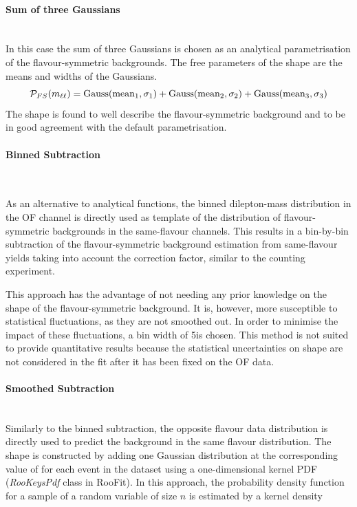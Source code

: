 \paragraph{Sum of three Gaussians}\mbox{} \\
In this case the sum of three Gaussians is chosen as an analytical parametrisation of the flavour-symmetric backgrounds. The free parameters of the shape are the means and widths of the Gaussians.
\begin{equation*}
\mathcal{P}_{FS}(m_{\ell\ell}) = \mathrm{Gauss}(\mathrm{mean}_1,\sigma_1) + \mathrm{Gauss}(\mathrm{mean}_2,\sigma_2) + \mathrm{Gauss}(\mathrm{mean}_3,\sigma_3)\\
\end{equation*}
The shape is found to well describe the flavour-symmetric background and to be in good agreement with the default parametrisation.
\paragraph{Binned Subtraction}\mbox{} \\


\label{shapesubtraction:binnedsubtraction}

As an alternative to analytical functions, the binned dilepton-mass distribution in the OF channel is directly used as  template of the distribution of flavour-symmetric backgrounds in the same-flavour channels. This results in a bin-by-bin subtraction of the flavour-symmetric background estimation from same-flavour yields taking into account the \Rsfof correction factor, similar to the counting experiment.

This approach has the advantage of not needing any prior knowledge on the shape of the flavour-symmetric background. It is, however, more susceptible to statistical fluctuations, as they are not smoothed out. In order to minimise the impact of these fluctuations, a bin width of 5\GeV is chosen. This method is not suited to provide quantitative results because the statistical uncertainties on shape are not considered in the fit after it has been fixed on the OF data.

\paragraph{Smoothed Subtraction}\mbox{} \\
Similarly to the binned subtraction, the opposite flavour data distribution is directly used to predict the background in the same flavour distribution. The shape is constructed by adding one Gaussian distribution at the corresponding value of \mll for each event in the dataset using a one-dimensional kernel PDF (\emph{RooKeysPdf} class in RooFit). In this approach, the probability density function for a sample of a random variable of size $n$ is estimated by a kernel density

